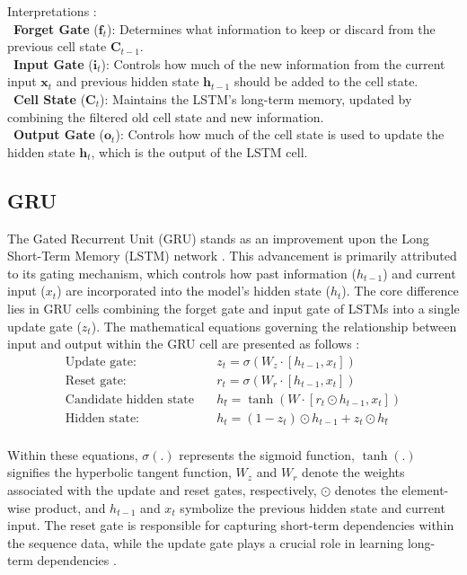 \documentclass{ieeeojies}
\begin{document}
Interpretations \cite{b18}: \\
         \indent\textbullet\ \textbf{Forget Gate} (\(\mathbf{f}_t\)): 
         Determines what information to keep or discard from the previous cell state \(\mathbf{C}_{t-1}\). \\
         \indent\textbullet\ \textbf{Input Gate} (\(\mathbf{i}_t\)): Controls how much of the new information from the current input \(\mathbf{x}_t\) and previous hidden state \(\mathbf{h}_{t-1}\) should be added to the cell state. \\
         \indent\textbullet\ \textbf{Cell State} (\(\mathbf{C}_t\)): Maintains the LSTM's long-term memory, updated by combining the filtered old cell state and new information. \\
         \indent\textbullet\ \textbf{Output Gate} (\(\mathbf{o}_t\)): Controls how much of the cell state is used to update the hidden state \(\mathbf{h}_t\), which is the output of the LSTM cell. \
 \subsection{GRU}
The Gated Recurrent Unit (GRU) stands as an improvement upon the Long Short-Term Memory (LSTM) network\cite{b20} . This advancement is primarily attributed to its gating mechanism, which controls how past information ($h_{t-1}$) and current input ($x_t$) are incorporated into the model's hidden state ($h_t$). The core difference lies in GRU cells combining the forget gate and input gate of LSTMs into a single update gate ($z_t$).
The mathematical equations governing the relationship between input and output within the GRU cell are presented as follows \cite{b20}:
\begin{align*}
\text{Update gate:} \quad & z_t = \sigma(W_z \cdot [h_{t-1}, x_t]) \\
\text{Reset gate:} \quad & r_t = \sigma(W_r \cdot [h_{t-1}, x_t]) \\
\text{Candidate hidden state} \quad & h_t \tilde{} = \tanh(W \cdot [r_t \odot h_{t-1}, x_t]) \\
\text{Hidden state:} \quad & h_t = (1 - z_t) \odot h_{t-1} + z_t \odot h_t \tilde{} \\
\end{align*}

Within these equations, $\sigma(.)$ represents the sigmoid function, $\tanh(.)$ signifies the hyperbolic tangent function, $W_z$ and $W_r$ denote the weights associated with the update and reset gates, respectively, $\odot$ denotes the element-wise product, and $h_{t-1}$ and $x_t$ symbolize the previous hidden state and current input. The reset gate is responsible for capturing short-term dependencies within the sequence data, while the update gate plays a crucial role in learning long-term dependencies \cite{b20}.
\end{document}
